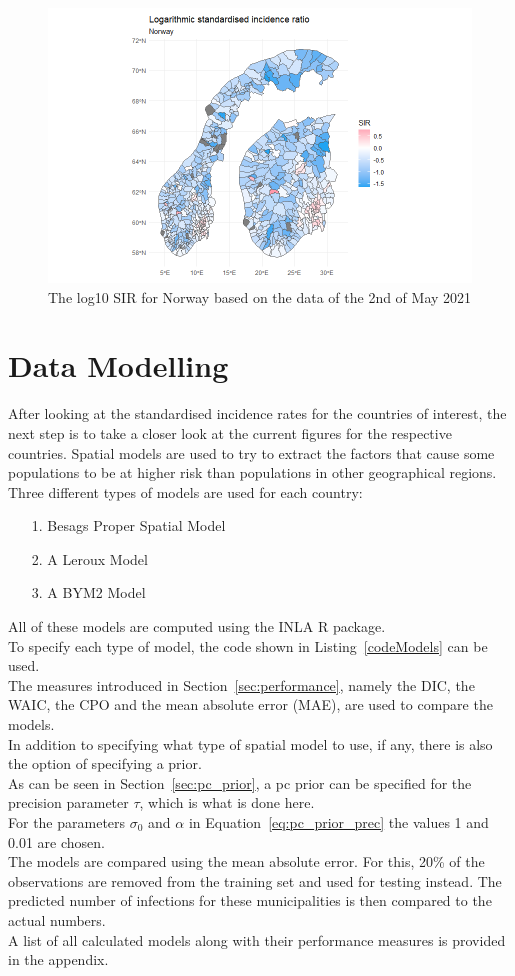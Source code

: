 \begin{figure}[H]
 \centering
 \includegraphics[width = 1.2\textwidth]{sir_norway_log.png}
 \caption{The log10 SIR for Norway based on the data of the 2nd of May 2021}
 \label{sirnorwaylog}
\end{figure}
\clearpage
\section{Data Modelling}
After looking at the standardised incidence rates for the countries of interest, the next step is to take a closer look at the current figures for the respective countries. Spatial models are used to try to extract the factors that cause some populations to be at higher risk than populations in other geographical regions. Three different types of models are used for each country:
\begin{itemize}
  \item[1.] Besags Proper Spatial Model
  \item[2.] A Leroux Model
  \item[3.] A BYM2 Model
\end{itemize}
All of these models are computed using the INLA \autocite[][]{rinla} R package. \\
To specify each type of model, the code shown in Listing~\ref{codeModels} can be used. \\
The measures introduced in Section~\ref{sec:performance}, namely the DIC, the WAIC, the CPO and the mean absolute error (MAE), are used to compare the models.\\
In addition to specifying what type of spatial model to use, if any, there is also the option of specifying a prior. \\
As can be seen in Section~\ref{sec:pc_prior}, a pc prior can be specified for the precision parameter $\tau$, which is what is done here. \\
For the parameters $\sigma_0$ and $\alpha$ in Equation~\ref{eq:pc_prior_prec} the values 1 and 0.01 are chosen. \\
The models are compared using the mean absolute error. For this, 20\% of the observations are removed from the training set and used for testing instead. The predicted number of infections for these municipalities is then compared to the actual numbers.
\\
A list of all calculated models along with their performance measures is provided in the appendix.
